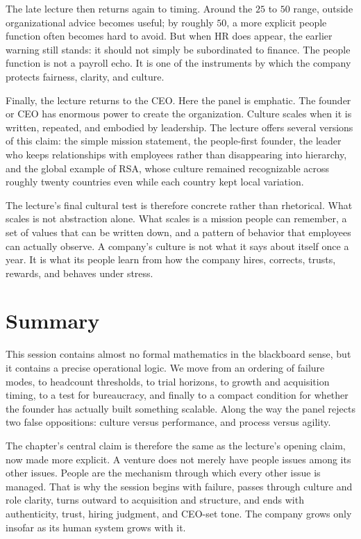 The late lecture then returns again to timing. Around the \(25\) to \(50\) range, outside organizational advice becomes useful; by roughly \(50\), a more explicit people function often becomes hard to avoid. But when HR does appear, the earlier warning still stands: it should not simply be subordinated to finance. The people function is not a payroll echo. It is one of the instruments by which the company protects fairness, clarity, and culture.

Finally, the lecture returns to the CEO. Here the panel is emphatic. The founder or CEO has enormous power to create the organization. Culture scales when it is written, repeated, and embodied by leadership. The lecture offers several versions of this claim: the simple mission statement, the people-first founder, the leader who keeps relationships with employees rather than disappearing into hierarchy, and the global example of RSA, whose culture remained recognizable across roughly twenty countries even while each country kept local variation.

The lecture's final cultural test is therefore concrete rather than rhetorical. What scales is not abstraction alone. What scales is a mission people can remember, a set of values that can be written down, and a pattern of behavior that employees can actually observe. A company's culture is not what it says about itself once a year. It is what its people learn from how the company hires, corrects, trusts, rewards, and behaves under stress.

\section{Summary}

This session contains almost no formal mathematics in the blackboard sense, but it contains a precise operational logic. We move from an ordering of failure modes, to headcount thresholds, to trial horizons, to growth and acquisition timing, to a test for bureaucracy, and finally to a compact condition for whether the founder has actually built something scalable. Along the way the panel rejects two false oppositions: culture versus performance, and process versus agility.

The chapter's central claim is therefore the same as the lecture's opening claim, now made more explicit. A venture does not merely have people issues among its other issues. People are the mechanism through which every other issue is managed. That is why the session begins with failure, passes through culture and role clarity, turns outward to acquisition and structure, and ends with authenticity, trust, hiring judgment, and CEO-set tone. The company grows only insofar as its human system grows with it.